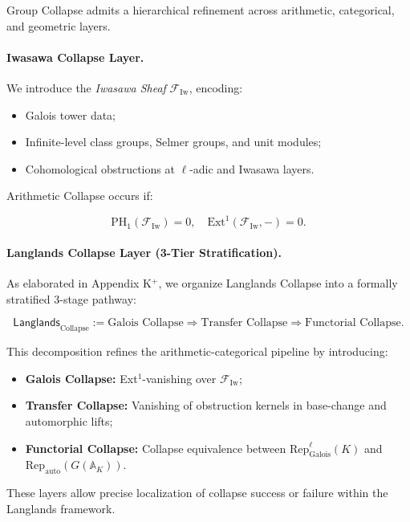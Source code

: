 \documentclass[11pt]{article}
\begin{document}
Group Collapse admits a hierarchical refinement across arithmetic, categorical, and geometric layers.

\paragraph{Iwasawa Collapse Layer.}
We introduce the \emph{Iwasawa Sheaf} \( \mathcal{F}_{\mathrm{Iw}} \), encoding:

\begin{itemize}
    \item Galois tower data;
    \item Infinite-level class groups, Selmer groups, and unit modules;
    \item Cohomological obstructions at $\ell$-adic and Iwasawa layers.
\end{itemize}

Arithmetic Collapse occurs if:

\[
\mathrm{PH}_1(\mathcal{F}_{\mathrm{Iw}}) = 0, \quad \mathrm{Ext}^1(\mathcal{F}_{\mathrm{Iw}}, -) = 0.
\]

\paragraph{Langlands Collapse Layer (3-Tier Stratification).}

As elaborated in Appendix K$^+$, we organize Langlands Collapse into a formally stratified 3-stage pathway:

\[
\mathsf{Langlands}_{\mathrm{Collapse}} :=
\text{Galois Collapse}
\Rightarrow
\text{Transfer Collapse}
\Rightarrow
\text{Functorial Collapse}.
\]

This decomposition refines the arithmetic-categorical pipeline by introducing:

\begin{itemize}
    \item \textbf{Galois Collapse:} Ext$^1$-vanishing over \( \mathcal{F}_{\mathrm{Iw}} \);
    \item \textbf{Transfer Collapse:} Vanishing of obstruction kernels in base-change and automorphic lifts;
    \item \textbf{Functorial Collapse:} Collapse equivalence between \( \mathrm{Rep}_{\mathrm{Galois}}^\ell(K) \) and \( \mathrm{Rep}_{\mathrm{auto}}(G(\mathbb{A}_K)) \).
\end{itemize}

These layers allow precise localization of collapse success or failure within the Langlands framework.
\end{document}
